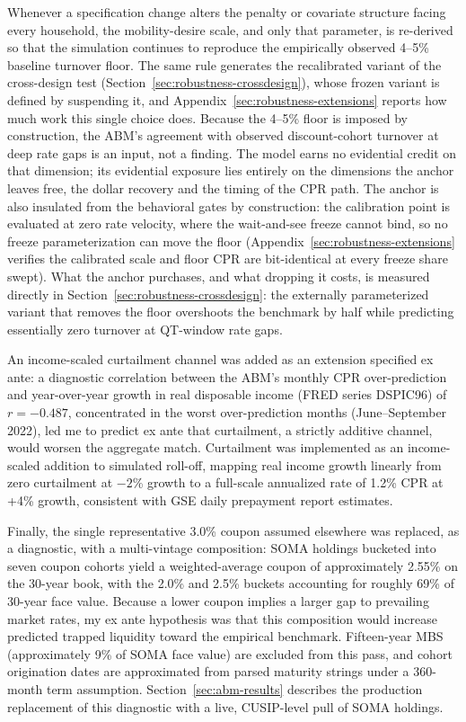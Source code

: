 \documentclass[12pt]{article}
\begin{document}
Whenever a specification change alters the penalty or covariate structure facing every household, the mobility-desire scale, and only that parameter, is re-derived so that the simulation continues to reproduce the empirically observed 4--5\% baseline turnover floor. The same rule generates the recalibrated variant of the cross-design test (Section~\ref{sec:robustness-crossdesign}), whose frozen variant is defined by suspending it, and Appendix~\ref{sec:robustness-extensions} reports how much work this single choice does. Because the 4--5\% floor is imposed by construction, the ABM's agreement with observed discount-cohort turnover at deep rate gaps is an input, not a finding. The model earns no evidential credit on that dimension; its evidential exposure lies entirely on the dimensions the anchor leaves free, the dollar recovery and the timing of the CPR path. The anchor is also insulated from the behavioral gates by construction: the calibration point is evaluated at zero rate velocity, where the wait-and-see freeze cannot bind, so no freeze parameterization can move the floor (Appendix~\ref{sec:robustness-extensions} verifies the calibrated scale and floor CPR are bit-identical at every freeze share swept). What the anchor purchases, and what dropping it costs, is measured directly in Section~\ref{sec:robustness-crossdesign}: the externally parameterized variant that removes the floor overshoots the benchmark by half while predicting essentially zero turnover at QT-window rate gaps.

An income-scaled curtailment channel was added as an extension specified ex ante: a diagnostic correlation between the ABM's monthly CPR over-prediction and year-over-year growth in real disposable income (FRED series DSPIC96) of $r = -0.487$, concentrated in the worst over-prediction months (June--September 2022), led me to predict ex ante that curtailment, a strictly additive channel, would worsen the aggregate match. Curtailment was implemented as an income-scaled addition to simulated roll-off, mapping real income growth linearly from zero curtailment at $-2$\% growth to a full-scale annualized rate of 1.2\% CPR at +4\% growth, consistent with GSE daily prepayment report estimates.

Finally, the single representative 3.0\% coupon assumed elsewhere was replaced, as a diagnostic, with a multi-vintage composition: SOMA holdings bucketed into seven coupon cohorts yield a weighted-average coupon of approximately 2.55\% on the 30-year book, with the 2.0\% and 2.5\% buckets accounting for roughly 69\% of 30-year face value. Because a lower coupon implies a larger gap to prevailing market rates, my ex ante hypothesis was that this composition would increase predicted trapped liquidity toward the empirical benchmark. Fifteen-year MBS (approximately 9\% of SOMA face value) are excluded from this pass, and cohort origination dates are approximated from parsed maturity strings under a 360-month term assumption. Section~\ref{sec:abm-results} describes the production replacement of this diagnostic with a live, CUSIP-level pull of SOMA holdings.
\end{document}
